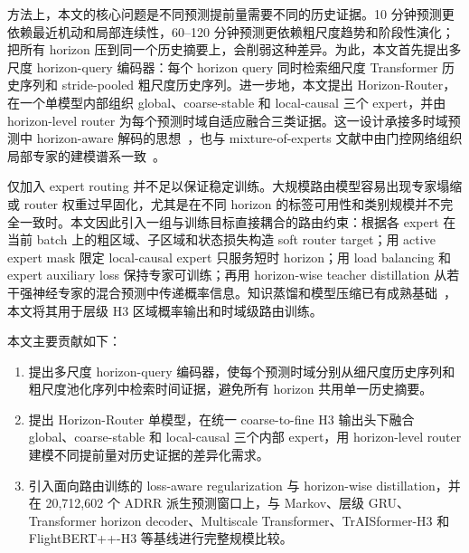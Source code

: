 方法上，本文的核心问题是不同预测提前量需要不同的历史证据。10 分钟预测更依赖最近机动和局部连续性，60--120 分钟预测更依赖粗尺度趋势和阶段性演化；把所有 horizon 压到同一个历史摘要上，会削弱这种差异。为此，本文首先提出多尺度 horizon-query 编码器：每个 horizon query 同时检索细尺度 Transformer 历史序列和 stride-pooled 粗尺度历史序列。进一步地，本文提出 Horizon-Router，在一个单模型内部组织 global、coarse-stable 和 local-causal 三个 expert，并由 horizon-level router 为每个预测时域自适应融合三类证据。这一设计承接多时域预测中 horizon-aware 解码的思想~\cite{lim2021tft,mqtransformer2020}，也与 mixture-of-experts 文献中由门控网络组织局部专家的建模谱系一致~\cite{Jacobs_1991,shazeer2017outrageouslylargeneuralnetworks,JMLR:v23:21-0998}。

仅加入 expert routing 并不足以保证稳定训练。大规模路由模型容易出现专家塌缩或 router 权重过早固化，尤其是在不同 horizon 的标签可用性和类别规模并不完全一致时。本文因此引入一组与训练目标直接耦合的路由约束：根据各 expert 在当前 batch 上的粗区域、子区域和状态损失构造 soft router target；用 active expert mask 限定 local-causal expert 只服务短时 horizon；用 load balancing 和 expert auxiliary loss 保持专家可训练；再用 horizon-wise teacher distillation 从若干强神经专家的混合预测中传递概率信息。知识蒸馏和模型压缩已有成熟基础~\cite{bucila2006model_compression,hinton2015distilling,furlanello2018born_again}，本文将其用于层级 H3 区域概率输出和时域级路由训练。

本文主要贡献如下：
\begin{enumerate}
  \item 提出多尺度 horizon-query 编码器，使每个预测时域分别从细尺度历史序列和粗尺度池化序列中检索时间证据，避免所有 horizon 共用单一历史摘要。
  \item 提出 Horizon-Router 单模型，在统一 coarse-to-fine H3 输出头下融合 global、coarse-stable 和 local-causal 三个内部 expert，用 horizon-level router 建模不同提前量对历史证据的差异化需求。
  \item 引入面向路由训练的 loss-aware regularization 与 horizon-wise distillation，并在 20,712,602 个 ADRR 派生预测窗口上，与 Markov、层级 GRU、Transformer horizon decoder、Multiscale Transformer、TrAISformer-H3 和 FlightBERT++-H3 等基线进行完整规模比较。
\end{enumerate}
